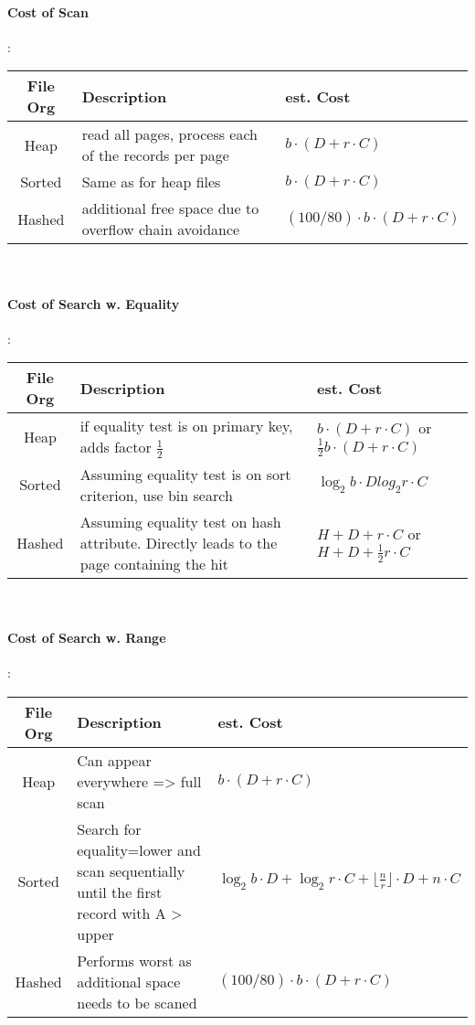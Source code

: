 \paragraph{Cost of Scan} :
\newline
\begin{tabular}{|c|p{3cm}|p{3cm}|} \hline
     File Org & Description & est. Cost \\ \hline
     Heap & read all pages, process each of the records per page & $b \cdot (D + r \cdot C)$ \\ \hline
     Sorted & Same as for heap files & $b \cdot (D + r \cdot C)$ \\ \hline
     Hashed & additional free space due to overflow chain avoidance & $ (100/80) \cdot b \cdot (D + r \cdot C)$ \\ \hline
\end{tabular} \\


\paragraph{Cost of Search w. Equality}: \\ 
\begin{tabular}{|c|p{3cm}|p{3cm}|} \hline
     File Org & Description & est. Cost \\ \hline
     Heap & if equality test is on primary key, adds factor $\frac{1}{2}$ & $b \cdot (D + r \cdot C)$ or  $ \frac{1}{2}b \cdot (D + r \cdot C)$ \\ \hline
     Sorted & Assuming equality test is on sort criterion, use bin search & $\log_2 b \cdot D  log_2 r \cdot C$ \\ \hline
     Hashed & Assuming equality test on hash attribute. Directly leads to the page containing the hit & $ H + D + r \cdot C$ or  $ H + D + \frac{1}{2} r \cdot C$ \\ \hline
\end{tabular} \\

\paragraph{Cost of Search w. Range}: \\ 
\begin{tabular}{|c|p{3cm}|p{3cm}|} \hline
     File Org & Description & est. Cost \\ \hline
     Heap & Can appear everywhere => full scan & $b \cdot (D + r \cdot C)$ \\ \hline
     Sorted & Search for equality=lower and scan sequentially until the first record with A > upper & $ \log_2 b \cdot D + \log_2 r \cdot C + \lfloor \frac{n}{r} \rfloor \cdot D + n \cdot C$ \\ \hline
     Hashed & Performs worst as additional space needs to be scaned  & $ (100/80) \cdot b \cdot (D + r \cdot C)$ \\ \hline
\end{tabular} \\


